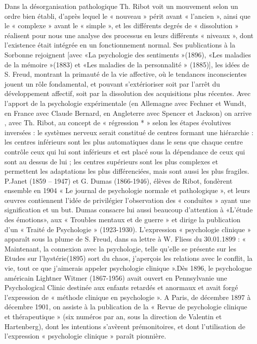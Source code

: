 Dans la désorganisation pathologique Th. Ribot voit un mouvement selon un ordre bien établi, d’après lequel le « nouveau » périt avant « l’ancien », ainsi que le « complexe » avant le « simple », et les différents degrés de « dissolution » réalisent pour nous une analyse des processus en leurs différents « niveaux », dont l’existence était intégrée en un fonctionnement normal. Ses publications à la Sorbonne rejoignent [avec «La psychologie des sentiments »(1896), «Les maladies de la mémoire »(1883) et «Les maladies de la personnalité » (1885)], les idées de S. Freud, montrant la primauté de la vie affective, où le tendances inconscientes jouent un rôle fondamental, et pouvant s’extérioriser soit par l’arrêt du développement affectif, soit par la dissolution des acquisitions plus récentes.
Avec l’apport de la psychologie expérimentale (en Allemagne avec
Fechner et Wundt, en France avec Claude Bernard, en Angleterre avec
Spencer et Jackson) on arrive , avec Th. Ribot, au concept de «
régression * » selon les étapes évolutives inversées : le systèmes
nerveux serait constitué de centres formant une hiérarchie : les
centres inférieurs sont les plus automatiques dans le sens que chaque centre contrôle ceux qui lui sont inférieurs et est placé sous la dépendance de ceux qui sont au dessus de lui ; les centres supérieurs sont les plus complexes et permettent les adaptations les plus différenciées, mais sont aussi les plus fragiles.
P.Janet (1859 – 1947) et G. Dumas (1866-1946), élèves de Ribot, fondèrent ensemble en 1904 « Le journal de psychologie normale et pathologique », et leurs œuvres contiennent l’idée de privilégier l’observation des « conduites » ayant une signification et un but.
Dumas consacre lui aussi beaucoup d’attention à «L’étude des émotions», aux « Troubles mentaux et de guerre » et dirige la publication d’un « Traité de Psychologie » (1923-1930).
L’expression « psychologie clinique » apparaît sous la plume de S. Freud, dans sa lettre à W. Fliess du 30.01.1899 : « Maintenant, la connexion avec la psychologie, telle qu’elle se présente sur les Etudes sur l’hystérie(1895) sort du chaos, j’aperçois les relations avec le conflit, la vie, tout ce que j’aimerais appeler psychologie clinique ».Dès 1896, le psychologue américain Lightner Witmer (1867-1956) avait ouvert en Pennsylvanie une Psychological Clinic destinée aux enfants retardés et anormaux et avait forgé l’expression de « méthode clinique en psychologie ».
A Paris, de décembre 1897 à décembre 1901, on assiste à la publication de la « Revue de psychologie clinique et thérapeutique » (six numéros par an, sous la direction de Valentin et Hartenberg), dont les intentions s’avèrent prémonitoires, et dont l’utilisation de l’expression « psychologie clinique » paraît pionnière.
